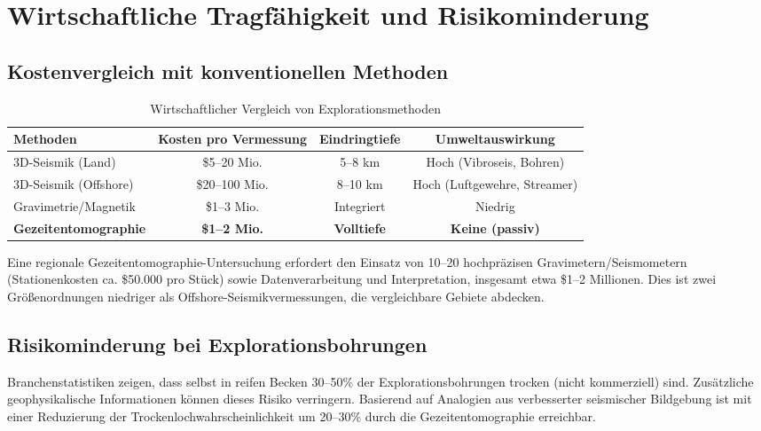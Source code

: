 \documentclass[12pt,a4paper]{article}
\theoremstyle{remark}
\begin{document}
	\section{Wirtschaftliche Tragfähigkeit und Risikominderung}
	\label{sec:economics}
	
	\subsection{Kostenvergleich mit konventionellen Methoden}
	
	\begin{table}[htbp]
		\centering
		\caption{Wirtschaftlicher Vergleich von Explorationsmethoden}
		\label{tab:economics}
		\small
		\begin{tabular}{lccc}
			\toprule
			\textbf{Methoden} & \textbf{Kosten pro Vermessung} & \textbf{Eindringtiefe} & \textbf{Umweltauswirkung} \\
			\midrule
			3D-Seismik (Land) & \$5–20 Mio. & 5–8 km & Hoch (Vibroseis, Bohren) \\
			3D-Seismik (Offshore) & \$20–100 Mio. & 8–10 km & Hoch (Luftgewehre, Streamer) \\
			Gravimetrie/Magnetik & \$1–3 Mio. & Integriert & Niedrig \\
			\textbf{Gezeitentomographie} & \textbf{\$1–2 Mio.} & \textbf{Volltiefe} & \textbf{Keine (passiv)} \\
			\bottomrule
		\end{tabular}
	\end{table}
	
	Eine regionale Gezeitentomographie-Untersuchung erfordert den Einsatz von 10–20 hochpräzisen Gravimetern/Seismometern (Stationenkosten ca. \$50.000 pro Stück) sowie Datenverarbeitung und Interpretation, insgesamt etwa \$1–2 Millionen. Dies ist zwei Größenordnungen niedriger als Offshore-Seismikvermessungen, die vergleichbare Gebiete abdecken.
	
	\subsection{Risikominderung bei Explorationsbohrungen}
	
	Branchenstatistiken zeigen, dass selbst in reifen Becken 30–50\% der Explorationsbohrungen trocken (nicht kommerziell) sind. Zusätzliche geophysikalische Informationen können dieses Risiko verringern. Basierend auf Analogien aus verbesserter seismischer Bildgebung ist mit einer Reduzierung der Trockenlochwahrscheinlichkeit um 20–30\% durch die Gezeitentomographie erreichbar.
	
\end{document}
